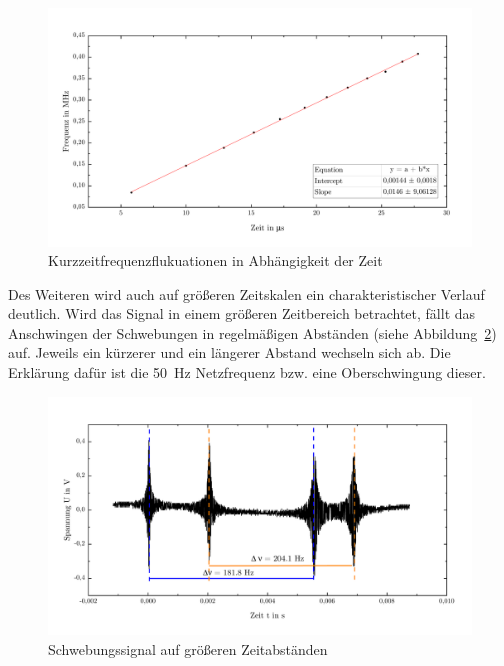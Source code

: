 \documentclass[a4paper,twoside,final]{article}
\begin{document}
\begin{figure}[h!t]
    \centering
        \includegraphics[width=1\textwidth]{Bilder/Kurzzeitfluktuationen.pdf}
    \caption{Kurzzeitfrequenzflukuationen in Abhängigkeit der Zeit}
      \label{fig:Kurzzeitfluktuationen}
\end{figure}

Des Weiteren wird auch auf größeren Zeitskalen ein charakteristischer Verlauf deutlich. Wird das Signal in einem größeren Zeitbereich betrachtet, fällt das Anschwingen der Schwebungen in regelmäßigen Abständen (siehe Abbildung~\ref{fig:Schwebungssignal_makro}) auf. Jeweils ein kürzerer und ein längerer Abstand wechseln sich ab. Die Erklärung dafür ist die \SI{50}{\hertz} Netzfrequenz bzw. eine Oberschwingung dieser.

\begin{figure}[h!t]
  \vspace{-5mm}
    \centering
        \includegraphics[width=1\textwidth]{Bilder/Fluktuationen_makroskopisch.pdf}
    \caption{Schwebungssignal auf größeren Zeitabständen}
    \label{fig:Schwebungssignal_makro}
\end{figure}
\end{document}
